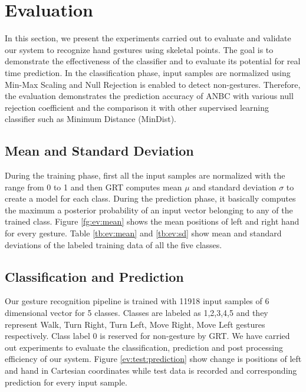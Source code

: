 

\section{Evaluation} In this section, we present the experiments carried out to evaluate and validate our system to recognize hand gestures using skeletal points. The goal is to demonstrate the effectiveness of the classifier and to evaluate its potential for real time prediction. In the classification phase, input samples are normalized using Min-Max Scaling and Null Rejection is enabled to detect non-gestures. Therefore, the evaluation demonstrates the prediction accuracy of ANBC with various null rejection coefficient and the comparison it with other supervised learning classifier such as Minimum Distance (MinDist).



\subsection{Mean and Standard Deviation} During the training phase, first all the input samples are normalized with the range from 0 to 1 and then GRT computes mean $\mu$ and standard deviation $\sigma$ to create a model for each class. During the prediction phase, it basically computes the maximum a posterior probability of an input vector belonging to any of the trained class. Figure \ref{fg:ev:mean} shows the mean positions of left and right hand for every gesture. Table \ref{tb:ev:mean} and \ref{tb:ev:sd} show mean and standard deviations of the labeled training data of all the five classes. 

 

\subsection{Classification and Prediction} Our gesture recognition pipeline is trained with 11918 input samples of 6 dimensional vector for 5 classes. Classes are labeled as 1,2,3,4,5 and they represent Walk, Turn Right, Turn Left, Move Right, Move Left gestures respectively. Class label 0 is reserved for non-gesture by GRT. We have carried out experiments to evaluate the classification, prediction and post processing efficiency of our system. Figure \ref{ev:test:prediction} show change is positions of left and hand in Cartesian coordinates while test data is recorded and corresponding prediction for every input sample.

